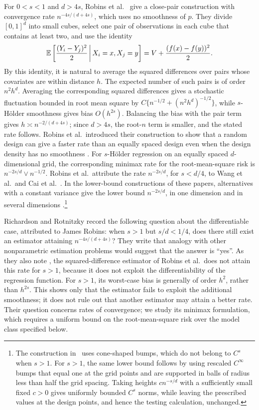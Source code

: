 For $0<s<1$ and $d>4s$, Robins et al.\ \cite[Section~4]{RobinsEtAl2008}
give a close-pair construction with convergence rate
$n^{-4s/(d+4s)}$, which uses no smoothness of $p$. They divide
$[0,1]^d$ into small cubes, select one pair of observations in each
cube that contains at least two, and use the identity
\[
 \mathbb E\left[\frac{(Y_i-Y_j)^2}{2}\,\middle|\,X_i=x,X_j=y\right]
 =V+\frac{(f(x)-f(y))^2}{2}.
\]
By this identity, it is natural to average the squared differences
over pairs whose covariates are within distance $h$. The expected number of such pairs
is of order $n^2h^d$. Averaging the corresponding squared differences
gives a stochastic fluctuation bounded in root mean square by
$C\{n^{-1/2}+(n^2h^d)^{-1/2}\}$, while $s$-H\"older smoothness gives
bias $O(h^{2s})$. Balancing the bias with the pair term gives
$h\asymp n^{-2/(d+4s)}$; since $d>4s$, the root-$n$ term is smaller,
and the stated rate follows. Robins et al.\ introduced their
construction to show that a random design can give a faster rate than
an equally spaced design even when the design density has no smoothness
\cite[p.~338]{RobinsEtAl2008}. For $s$-H\"older regression on an
equally spaced $d$-dimensional grid, the corresponding
minimax rate for the root-mean-square risk is $n^{-2s/d}\vee n^{-1/2}$. Robins et
al.\ attribute the rate $n^{-2s/d}$, for $s<d/4$, to Wang et al.\ and
Cai et al.\ \cite[p.~338]{RobinsEtAl2008}. In the lower-bound
constructions of these papers, alternatives with a constant variance
give the lower bound $n^{-2s/d}$, in one dimension
\cite[Section~6.2]{WangBrownCaiLevine2008} and in several dimensions
\cite[Section~6]{CaiLevineWang2009}.\footnote{The construction
in~\cite[Section~6]{CaiLevineWang2009} uses cone-shaped bumps, which do
not belong to $C^s$ when $s>1$. For \(s>1\), the same lower bound
follows by using rescaled \(C^\infty\) bumps that equal one at the grid
points and are supported in balls of radius less than half the grid
spacing. Taking heights \(cn^{-s/d}\) with a sufficiently small fixed \(c>0\)
gives uniformly bounded \(C^s\) norms, while leaving the
prescribed values at the design points, and hence the testing
calculation, unchanged.}

Richardson and Rotnitzky \cite[Section~6]{RichardsonRotnitzky2014}
record the following question about the differentiable case,
attributed to James Robins: when $s>1$ but $s/d<1/4$, does there still
exist an estimator attaining $n^{-4s/(d+4s)}$? They write that analogy
with other nonparametric estimation problems would suggest that the
answer is ``yes''. As they also note
\cite[Section~6, footnote~50]{RichardsonRotnitzky2014}, the
squared-difference estimator of Robins et al.\ does not attain this
rate for $s>1$, because it does not exploit the differentiability of
the regression function. For $s>1$, its worst-case bias is generally
of order $h^2$, rather than $h^{2s}$. This shows only that the
estimator fails to exploit the additional smoothness; it does not rule
out that another estimator may attain a better rate. Their question
concerns rates of convergence; we study its minimax formulation,
which requires a uniform bound on the root-mean-square risk over the
model class specified below.

